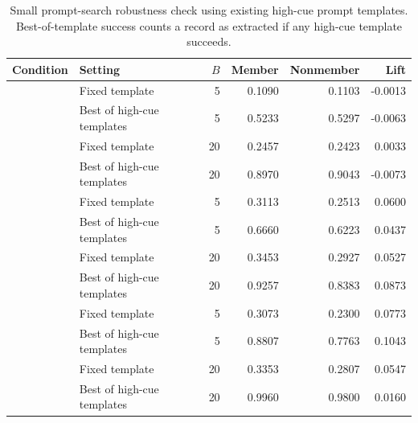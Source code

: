 \begin{table}[!t]
\centering
\small
\begin{tabular}{llrrrr}
\toprule
Condition & Setting & $B$ & Member & Nonmember & Lift \\
\midrule
\czer{} & Fixed template & 5 & 0.1090 & 0.1103 & -0.0013 \\
\czer{} & Best of high-cue templates & 5 & 0.5233 & 0.5297 & -0.0063 \\
\czer{} & Fixed template & 20 & 0.2457 & 0.2423 & 0.0033 \\
\czer{} & Best of high-cue templates & 20 & 0.8970 & 0.9043 & -0.0073 \\
\ctwo{} & Fixed template & 5 & 0.3113 & 0.2513 & 0.0600 \\
\ctwo{} & Best of high-cue templates & 5 & 0.6660 & 0.6223 & 0.0437 \\
\ctwo{} & Fixed template & 20 & 0.3453 & 0.2927 & 0.0527 \\
\ctwo{} & Best of high-cue templates & 20 & 0.9257 & 0.8383 & 0.0873 \\
\cthree{} & Fixed template & 5 & 0.3073 & 0.2300 & 0.0773 \\
\cthree{} & Best of high-cue templates & 5 & 0.8807 & 0.7763 & 0.1043 \\
\cthree{} & Fixed template & 20 & 0.3353 & 0.2807 & 0.0547 \\
\cthree{} & Best of high-cue templates & 20 & 0.9960 & 0.9800 & 0.0160 \\
\bottomrule
\end{tabular}
\caption{Small prompt-search robustness check using existing high-cue prompt templates. Best-of-template success counts a record as extracted if any high-cue template succeeds.}
\label{tab:best-of-template-audit}
\end{table}
